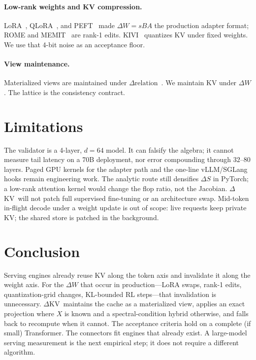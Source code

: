 \documentclass{article}
\newcommand{\dkv}{$\Delta$KV}
\begin{document}
\paragraph{Low-rank weights and KV compression.}
LoRA~\citep{hu2022lora}, QLoRA~\citep{dettmers2023qlora}, and
PEFT~\citep{mangrulkar2022peft} made $\Delta W=sBA$ the production
adapter format; ROME and MEMIT~\citep{meng2022rome,meng2023memit} are
rank-1 edits.
KIVI~\citep{liu2024kivi} quantizes KV under fixed weights.
We use that 4-bit noise as an acceptance floor.

\paragraph{View maintenance.}
Materialized views are maintained under
$\Delta\mathrm{relation}$~\citep{gupta1993ivm}.
We maintain KV under $\Delta W$.
The lattice is the consistency contract.

\section{Limitations}
\label{sec:limit}

The validator is a 4-layer, $d{=}64$ model.
It can falsify the algebra; it cannot measure tail latency on a 70B
deployment, nor error compounding through $32$--$80$ layers.
Paged GPU kernels for the adapter path and the one-line vLLM/SGLang
hooks remain engineering work.
The analytic route still densifies $\Delta S$ in PyTorch; a low-rank
attention kernel would change the flop ratio, not the Jacobian.
\dkv\ will not patch full supervised fine-tuning or an architecture
swap.
Mid-token in-flight decode under a weight update is out of scope: live
requests keep private KV; the shared store is patched in the background.

\section{Conclusion}
\label{sec:conc}

Serving engines already reuse KV along the token axis and invalidate it
along the weight axis.
For the $\Delta W$ that occur in production---LoRA swaps, rank-1 edits,
quantization-grid changes, KL-bounded RL steps---that invalidation is
unnecessary.
\dkv\ maintains the cache as a materialized view, applies an exact
projection where $X$ is known and a spectral-condition hybrid otherwise,
and falls back to recompute when it cannot.
The acceptance criteria hold on a complete (if small) Transformer.
The connectors fit engines that already exist.
A large-model serving measurement is the next empirical step; it does
not require a different algorithm.
\end{document}
